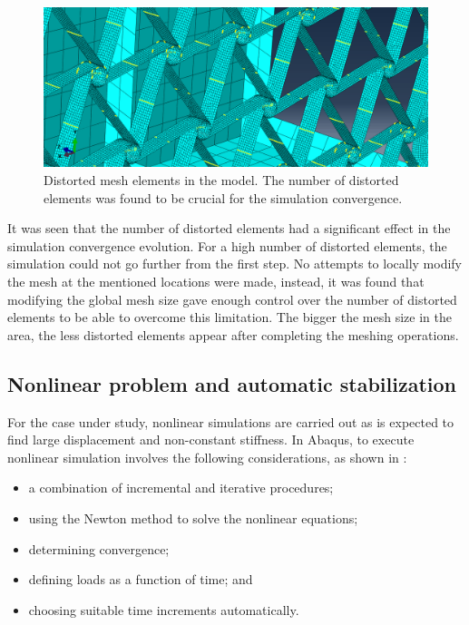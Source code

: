     \begin{figure}[!htpb]
      \centering
      \includegraphics[width=0.8 \textwidth]{figures/result-model/meshDistorted}
      \caption[Distorted mesh elements in the model]{Distorted mesh elements in the model. The number of distorted elements was found to be crucial for the simulation convergence.}\label{fig:meshDistorted}
    \end{figure}

    It was seen that the number of distorted elements had a significant effect in the simulation convergence evolution. For a high number of distorted elements, the simulation could not go further from the first step. No attempts to locally modify the mesh at the mentioned locations were made, instead, it was found that modifying the global mesh size gave enough control over the number of distorted elements to be able to overcome this limitation. The bigger the mesh size in the area, the less distorted elements appear after completing the meshing operations.

  \clearpage
  \subsection{Nonlinear problem and automatic stabilization} \label{subsec:nonlinear_results_model} %

    For the case under study, nonlinear simulations are carried out as is expected to find large displacement and non-constant stiffness. In Abaqus, to execute nonlinear simulation involves the following considerations, as shown in \cite{Abaqus}:
    \begin{itemize}
      \item a combination of incremental and iterative procedures;
      \item using the Newton method to solve the nonlinear equations;
      \item determining convergence;
      \item defining loads as a function of time; and
      \item choosing suitable time increments automatically.
    \end{itemize}

